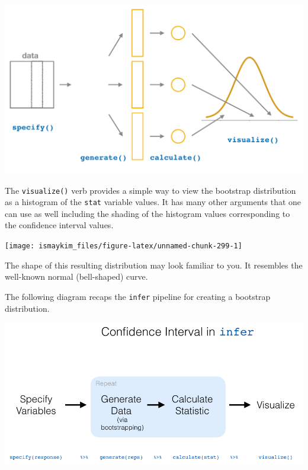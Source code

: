 \documentclass[12pt, krantz2,]{krantz}
\makeatletter
\newenvironment{Shaded}{\begin{snugshade}}{\end{snugshade}}
\newcommand{\CommentTok}[1]{\textcolor[rgb]{0.37,0.37,0.37}{\textit{#1}}}
\newcommand{\KeywordTok}[1]{\textcolor[rgb]{0.27,0.27,0.27}{\textbf{#1}}}
\newcommand{\NormalTok}[1]{#1}
\newcommand{\OperatorTok}[1]{\textcolor[rgb]{0.43,0.43,0.43}{\textbf{#1}}}
\newcommand{\StringTok}[1]{\textcolor[rgb]{0.5,0.5,0.5}{#1}}
\newenvironment{kframe}{%
\medskip{}
\setlength{\fboxsep}{.8em}
 \def\at@end@of@kframe{}%
 \ifinner\ifhmode%
  \def\at@end@of@kframe{\end{minipage}}%
  \begin{minipage}{\columnwidth}%
 \fi\fi%
 \def\FrameCommand##1{\hskip\@totalleftmargin \hskip-\fboxsep
 \colorbox{shadecolor}{##1}\hskip-\fboxsep
     \hskip-\linewidth \hskip-\@totalleftmargin \hskip\columnwidth}%
 \MakeFramed {\advance\hsize-\width
   \@totalleftmargin\z@ \linewidth\hsize
   \@setminipage}}%
 {\par\unskip\endMakeFramed%
 \at@end@of@kframe}
\renewenvironment{Shaded}{\begin{kframe}}{\end{kframe}}
\makeatother
\begin{document}
\begin{center}\includegraphics[width=\textwidth]{images/flowcharts/infer/visualize} \end{center}

The \texttt{visualize()} verb provides a simple way to view the bootstrap distribution as a histogram of the \texttt{stat} variable values. It has many other arguments that one can use as well including the shading of the histogram values corresponding to the confidence interval values.

\begin{Shaded}
\end{Shaded}

\begin{center}\texttt{[image: ismaykim\_files/figure-latex/unnamed-chunk-299-1]} \end{center}

The shape of this resulting distribution may look familiar to you. It resembles the well-known normal (bell-shaped) curve.

The following diagram recaps the \texttt{infer} pipeline for creating a bootstrap distribution.

\begin{center}\includegraphics[width=\textwidth]{images/flowcharts/infer/ci_diagram} \end{center}
\end{document}
